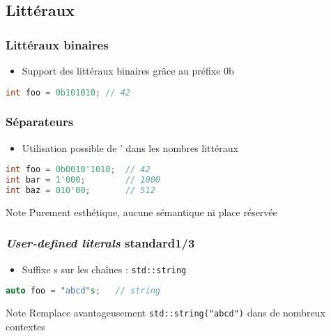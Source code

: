\documentclass[C++.tex]{subfiles}
\begin{document}
\subsection*{Littéraux}
\begin{frame}[fragile]
	\frametitle{Littéraux binaires}
	\begin{itemize}
		\item Support des littéraux binaires grâce au préfixe \og 0b\fg{}
	\end{itemize}

	\begin{lstlisting}[language=C++]
int foo = 0b101010; // 42\end{lstlisting}
\end{frame}

\begin{frame}[fragile]
	\frametitle{Séparateurs}
	\begin{itemize}
		\item Utilisation possible de ' dans les nombres littéraux
	\end{itemize}

	\begin{lstlisting}[language=C++]
int foo = 0b0010'1010;  // 42
int bar = 1'000;        // 1000
int baz = 010'00;       // 512\end{lstlisting}

	\begin{block}{Note}
		Purement esthétique, aucune sémantique ni place réservée
	\end{block}
\end{frame}

\begin{frame}[fragile]
	\frametitle{\textit{User-defined literals} standard\titlehfill{}1/3}


	\begin{itemize}
		\item Suffixe \og s\fg{} sur les chaînes : \lstinline|std::string|
	\end{itemize}

	\begin{lstlisting}[language=C++]
auto foo = "abcd"s;   // string\end{lstlisting}

	\begin{block}{Note}
		Remplace avantageusement \lstinline|std::string("abcd")| dans de nombreux contextes
	\end{block}
\end{frame}
\end{document}
